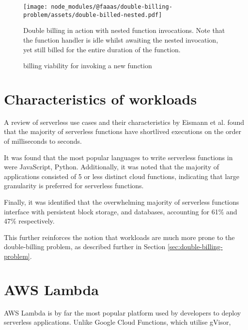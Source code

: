 \begin{figure}[t]
    \texttt{[image: node\_modules/@faaas/double-billing-problem/assets/double-billed-nested.pdf]}
    \caption{Double billing in action with nested function invocations. Note that the function handler is idle whilst awaiting the nested invocation, yet still billed for the entire duration of the function.}
    \label{fig:double-billing-nested}
\end{figure}

\begin{figure*}[t]
    \begin{center}
        
    \end{center}
    \caption{\faas{} billing viability for invoking a new function}
\end{figure*}

\section{Characteristics of \faas{} workloads}
A review of serverless use cases and their characteristics by Eismann et al.\cite{eismannReviewServerlessUse2020} found that the majority of serverless functions have shortlived executions on the order of milliseconds to seconds.

It was found that the most popular languages to write serverless functions in were JavaScript, Python. Additionally, it was noted that the majority of applications consisted of 5 or less distinct cloud functions, indicating that large granularity is preferred for serverless functions.

Finally, it was identified that the overwhelming majority of serverless functions interface with persistent block storage, and databases, accounting for 61\% and 47\% respectively.

This further reinforces the notion that \faas{} workloads are much more prone to the double-billing problem, as described further in Section \ref{sec:double-billing-problem}.

\section{AWS Lambda}
AWS Lambda is by far the most popular\cite{eismannReviewServerlessUse2020,StateServerlessDatadog} \faas{} platform used by developers to deploy serverless applications. Unlike Google Cloud Functions, which utilise gVisor\cite{GVisor},

